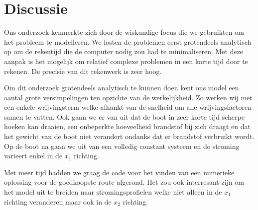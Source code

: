 \chapter{Discussie}
Ons onderzoek kenmerkte zich door de wiskundige focus die we gebruikten om het probleem te modelleren. We losten de problemen eerst grotendeels analytisch op om de rekentijd die de computer nodig zou had te minimaliseren. Met deze aanpak is het mogelijk om relatief complexe problemen in een korte tijd door te rekenen. De precisie van dit rekenwerk is zeer hoog.

Om dit onderzoek grotendeels analytisch te kunnen doen kent ons model een aantal grote versimpelingen ten opzichte van de werkelijkheid. Zo werken wij met een enkele wrijvingsterm welke afhankt van de snelheid om alle wrijvingsfactoren samen te vatten. Ook gaan we er van uit dat de boot in zeer korte tijd scherpe hoeken kan draaien, een onbeperkte hoeveelheid brandstof bij zich draagt en dat het gewicht van de boot niet verandert ondanks dat er brandstof verbruikt wordt. Op de boot na gaan we uit van een volledig constant systeem en de stroming varieert enkel in de \(x_1\) richting.

Met meer tijd hadden we graag de code voor het vinden van een numerieke oplossing voor de goedkoopste route afgerond. Het zou ook interresant zijn om het model uit te breiden naar stromingsprofielen welke niet alleen in de \(x_1\) richting veranderen maar ook in de \(x_2\) richting. 